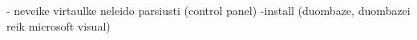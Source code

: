 - neveike virtaulke neleido parsiusti (control panel)
-install (duombaze, duombazei reik microsoft visual)